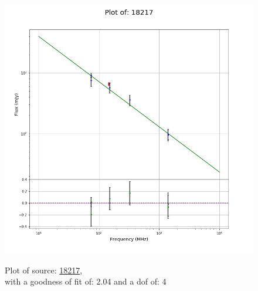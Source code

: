 \documentclass{article}
\begin{document}
\begin{figure}[H]
\begin{minipage}{0.5\textwidth}
        \includegraphics[scale = 0.35]{KmeulenTrap4P23_1min/1min18217.png}
        \captionsetup{labelformat=empty}
        \caption{Plot of source: \href{http://banana.transientskp.org/r4/vlo_KmeulenTrap4P23/runningcatalog/18217}{18217},\\with a goodness of fit of: 2.04 and a dof of: 4}
    \addtocounter{figure}{-1}
    \label{KmeulenTrap4P23:1min:18217:plot}
    \end{minipage}
\end{figure}
\end{document}
